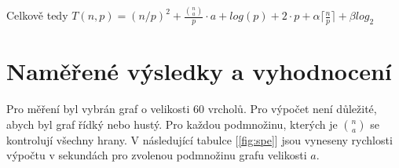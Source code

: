 \documentclass[a4paper,10pt]{report}
\begin{document}
\hspace{1cm}

Celkově tedy $T(n,p) = (n/p)^2 + \frac{{n \choose a}}{p}\cdot a + log(p) + 2 \cdot p + \alpha \lceil \frac{n}{p} \rceil + \beta log_{2}$

\chapter{Naměřené výsledky a vyhodnocení}

Pro měření byl vybrán graf o velikosti 60 vrcholů. Pro výpočet není důležité, abych byl graf řídký nebo hustý. Pro každou podmnožinu, kterých je ${n \choose a}$ se kontrolují všechny hrany. V následující tabulce [\ref{fig:spe}] jsou vyneseny rychlosti výpočtu v sekundách pro zvolenou podmnožinu grafu velikosti $a$.
\end{document}
